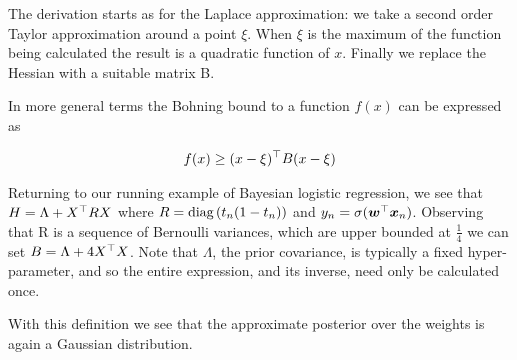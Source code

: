 The derivation starts as for the Laplace approximation: we take a second order Taylor approximation around a point $\xi$. When $\xi$ is the maximum of the function being calculated the result is a quadratic function of $x$. Finally we replace the Hessian with a suitable matrix B.

In more general terms the Bohning bound to a function $f(x)$ can be expressed as

\begin{align}
f(x) \geq (x - \xi)^\top B (x - \xi)
\end{align}

Returning to our running example of Bayesian logistic regression, we see that $H = \Lambda + X^\top R X$ where $R = \text{diag} \left( {t_n (1-t_n)} \right)$ and $y_n = \sigma(\bm w^\top\bm x_n)$. Observing that R is a sequence of Bernoulli variances, which are upper bounded at $\frac{1}{4}$ we can set $B = \Lambda + 4 X^\top X$. Note that $\Lambda$, the prior covariance, is typically a fixed hyper-parameter, and so the entire expression, and its inverse, need only be calculated once.

With this definition we see that the approximate posterior over the weights is again a Gaussian distribution.%

